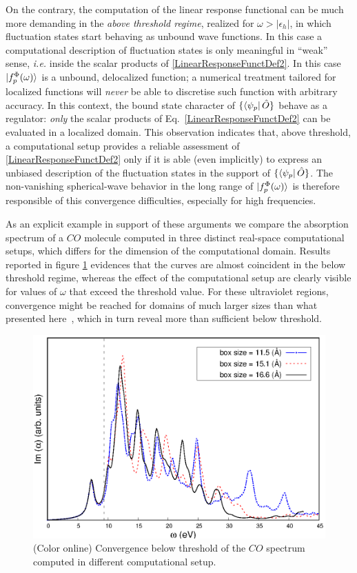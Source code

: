 \documentclass[reprint,aps,prb]{revtex4-1}
\newcommand{\eps}{\epsilon}
\newcommand{\op}[1]{\hat {#1}}
\begin{document}
On the contrary, the computation of the linear response functional can be much more demanding in the \emph{above threshold regime}, realized for $\omega>|\eps_h|$, in which fluctuation 
states start behaving as unbound wave functions. In this case a computational description of fluctuation states is only meaningful in ``weak'' sense,
\emph{i.e.} inside the scalar products of 
\eqref{LinearResponseFunctDef2}. 
In this case $\ket{f_p^\Phi(\omega)}$ is a unbound, delocalized function; a numerical treatment tailored for localized
functions will \emph{never} be able to discretise such function with arbitrary accuracy.  
In this context, the bound state character of $\{\bra{\psi_p}\op O\}$ behave as a regulator:
\emph{only} the scalar products of Eq.~\eqref{LinearResponseFunctDef2} can be evaluated in a localized domain.
This observation indicates that, above threshold, a computational setup 
provides a reliable assessment of \eqref{LinearResponseFunctDef2} only if it is able (even implicitly) to express an
unbiased description of the fluctuation states in the support of $\{\bra{\psi_p}\op O\}$.
The non-vanishing spherical-wave behavior in the long range of $\ket{f_p^\Phi(\omega)}$ is therefore responsible
of this convergence difficulties, especially for high frequencies.

As an explicit example in support of these arguments we compare the absorption spectrum of a $CO$ molecule computed in 
three distinct real-space computational setups, which differs for the dimension of 
the computational domain. Results reported in figure \ref{co_spectrum} evidences that the curves are almost coincident in the below threshold regime,
whereas the effect of the computational setup are clearly visible for values of $\omega$ that exceed the threshold value.
For these ultraviolet regions, convergence might be reached for domains of much larger sizes than what presented here~\cite{baroni2008},
which in turn reveal more than sufficient below threshold.

\begin{figure}
\includegraphics[scale=0.6]{CO_spectrum.eps}
\caption{\label{co_spectrum}(Color online) Convergence below threshold of the $CO$ spectrum computed in different computational setup.}
\end{figure}
\end{document}
